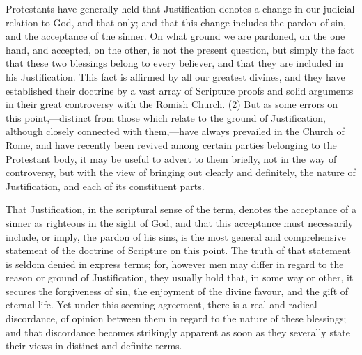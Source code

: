 \documentclass[
]{book}
\begin{document}
Protestants have generally held that Justification denotes a change in our judicial relation to God, and that only; and that this change includes the pardon of sin, and the acceptance of the sinner. On what ground we are pardoned, on the one hand, and accepted, on the other, is not the present question, but simply the fact that these two blessings belong to every believer, and that they are included in his Justification. This fact is affirmed by all our greatest divines, and they have established their doctrine by a vast array of Scripture proofs and solid arguments in their great controversy with the Romish Church. (2) But as some errors on this point,---distinct from those which relate to the ground of Justification, although closely connected with them,---have always prevailed in the Church of Rome, and have recently been revived among certain parties belonging to the Protestant body, it may be useful to advert to them briefly, not in the way of controversy, but with the view of bringing out clearly and definitely, the nature of Justification, and each of its constituent parts.

That Justification, in the scriptural sense of the term, denotes the acceptance of a sinner as righteous in the sight of God, and that this acceptance must necessarily include, or imply, the pardon of his sins, is the most general and comprehensive statement of the doctrine of Scripture on this point. The truth of that statement is seldom denied in express terms; for, however men may differ in regard to the reason or ground of Justification, they usually hold that, in some way or other, it secures the forgiveness of sin, the enjoyment of the divine favour, and the gift of eternal life. Yet under this seeming agreement, there is a real and radical discordance, of opinion between them in regard to the nature of these blessings; and that discordance becomes strikingly apparent as soon as they severally state their views in distinct and definite terms.
\end{document}
